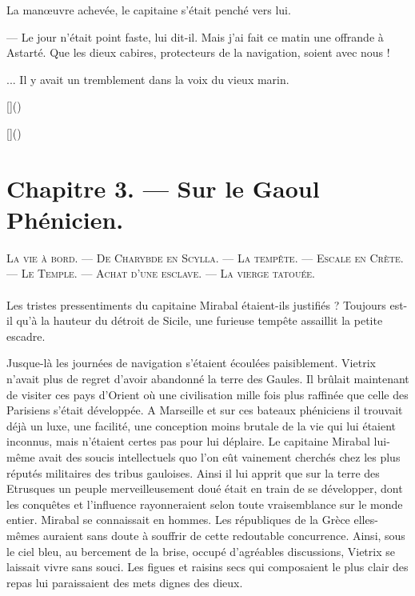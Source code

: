 \documentclass[a4paper, 11pt, oneside, polutonikogreek, french]{article}
\begin{document}
La manœuvre achevée, le capitaine s'était penché vers lui.

--- Le jour n'était point faste, lui dit-il. Mais j'ai fait ce matin une offrande à Astarté. Que les dieux cabires, protecteurs de la navigation, soient avec nous !

... Il y avait un tremblement dans la voix du vieux marin.

[]()

[]()
\clearpage
\section{Chapitre 3. --- Sur le Gaoul Phénicien.}
\begin{center}
\scshape
\small
La vie à bord. --- De Charybde en Scylla. --- La tempête. --- Escale en Crète. --- Le Temple. --- Achat d'une esclave. --- La vierge tatouée.
\end{center}
\paragraph{}
Les tristes pressentiments du capitaine Mirabal étaient-ils justifiés ? Toujours est-il qu'à la hauteur du détroit de Sicile, une furieuse tempête assaillit la petite escadre.

Jusque-là les journées de navigation s'étaient écoulées paisiblement. Vietrix n'avait plus de regret d'avoir abandonné la terre des Gaules. Il brûlait maintenant de visiter ces pays d'Orient où une civilisation mille fois plus raffinée que celle des Parisiens s'était développée. A Marseille et sur ces bateaux phéniciens il trouvait déjà un luxe, une facilité, une conception moins brutale de la vie qui lui étaient inconnus, mais n'étaient certes pas pour lui déplaire. Le capitaine Mirabal lui-même avait des soucis intellectuels quo l'on eût vainement cherchés chez les plus réputés militaires des tribus gauloises. Ainsi il lui apprit que sur la terre des Etrusques un peuple merveilleusement doué était en train de se développer, dont les conquêtes et l'influence rayonneraient selon toute vraisemblance sur le monde entier. Mirabal se connaissait en hommes. Les républiques de la Grèce elles-mêmes auraient sans doute à souffrir de cette redoutable concurrence. Ainsi, sous le ciel bleu, au bercement de la brise, occupé d'agréables discussions, Vietrix se laissait vivre sans souci. Les figues et raisins secs qui composaient le plus clair des repas lui paraissaient des mets dignes des dieux.

\bigskip
\centerline{\EightStarTaper}
\centerline{\EightStarTaper\EightStarTaper}
\bigskip
\end{document}

